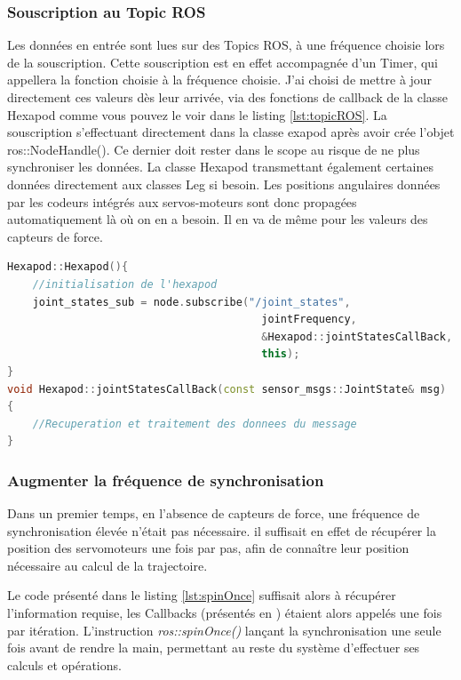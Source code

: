 \documentclass{tnreport}
\begin{document}
\subsubsection{Souscription au Topic ROS}
Les données en entrée sont lues sur des Topics \gls{ROS}, à une fréquence choisie lors de la souscription. Cette souscription est en effet accompagnée d'un Timer, qui appellera la fonction choisie à la fréquence choisie. J'ai choisi de mettre à jour directement ces valeurs dès leur arrivée, via des fonctions de callback de la classe Hexapod comme vous pouvez le voir dans le listing \ref{lst:topicROS}. La souscription s'effectuant directement dans la classe exapod après avoir crée l'objet ros::NodeHandle(). Ce dernier doit rester dans le scope au risque de ne plus synchroniser les données. La classe Hexapod transmettant également certaines données directement aux classes Leg si besoin. Les positions angulaires données par les codeurs intégrés aux servos-moteurs sont donc propagées automatiquement là où on en a besoin. Il en va de même pour les valeurs des capteurs de force.  

\begin{lstlisting}[language=c++,caption={Implémentation de la souscription à un topic ROS}, label={lst:topicROS}]
Hexapod::Hexapod(){
    //initialisation de l'hexapod
    joint_states_sub = node.subscribe("/joint_states", 
                                        jointFrequency, 
                                        &Hexapod::jointStatesCallBack, 
                                        this);
}
void Hexapod::jointStatesCallBack(const sensor_msgs::JointState& msg)
{
    //Recuperation et traitement des donnees du message
}
\end{lstlisting}

\subsubsection{Augmenter la fréquence de synchronisation}
Dans un premier temps, en l'absence de capteurs de force, une fréquence de synchronisation élevée n'était pas nécessaire. il suffisait en effet de récupérer la position des servomoteurs une fois par pas, afin de connaître leur position nécessaire au calcul de la trajectoire.  

Le code présenté dans le listing \ref{lst:spinOnce} suffisait alors à récupérer l'information requise, les Callbacks (présentés en \label{lb:callback}) étaient alors appelés une fois par itération. L'instruction \textit{ros::spinOnce()} lançant la synchronisation une seule fois avant de rendre la main, permettant au reste du système d'effectuer ses calculs et opérations.   
\end{document}
